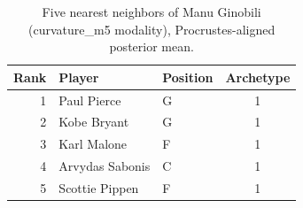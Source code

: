 \begin{table}[htbp]
  \centering\small
  \begin{tabular}{rllc}
    \toprule
    Rank & Player & Position & Archetype \\
    \midrule
    1 & Paul Pierce & G & 1 \\
    2 & Kobe Bryant & G & 1 \\
    3 & Karl Malone & F & 1 \\
    4 & Arvydas Sabonis & C & 1 \\
    5 & Scottie Pippen & F & 1 \\
    \bottomrule
  \end{tabular}
  \caption{Five nearest neighbors of Manu Ginobili (curvature_m5 modality), Procrustes-aligned posterior mean.}
  \label{tab:Manu_Ginobili_neighbors_curvature_m5}
\end{table}

